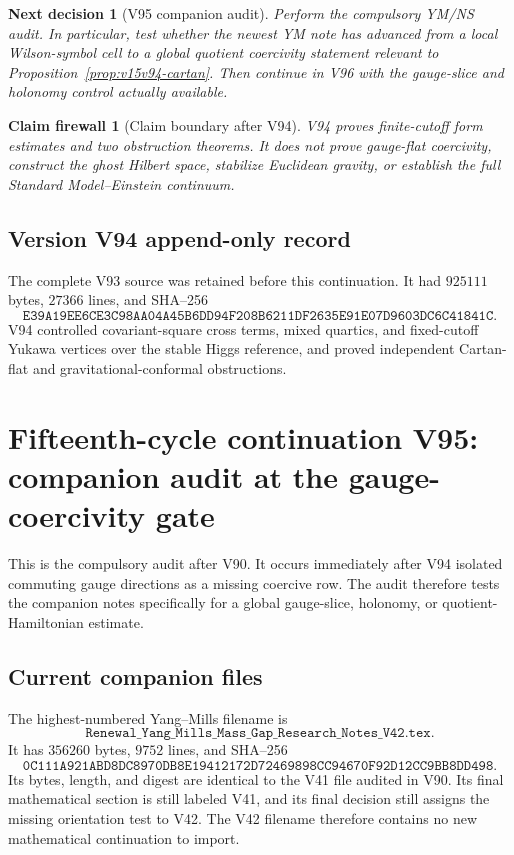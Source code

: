 \documentclass[11pt]{article}
\newtheorem{firewall}[theorem]{Claim firewall}
\newtheorem{decision}[theorem]{Next decision}
\theoremstyle{remark}
\begin{document}
\begin{decision}[V95 companion audit]
\label{dec:v15v94-next}
Perform the compulsory YM/NS audit.  In particular, test whether the
newest YM note has advanced from a local Wilson-symbol cell to a
global quotient coercivity statement relevant to
Proposition~\ref{prop:v15v94-cartan}.  Then continue in V96 with the
gauge-slice and holonomy control actually available.
\end{decision}

\begin{firewall}[Claim boundary after V94]
\label{fire:v15v94}
V94 proves finite-cutoff form estimates and two obstruction
theorems.  It does not prove gauge-flat coercivity, construct the
ghost Hilbert space, stabilize Euclidean gravity, or establish the
full Standard Model--Einstein continuum.
\end{firewall}

\section*{Version V94 append-only record}
The complete V93 source was retained before this continuation.  It
had \(925111\) bytes, \(27366\) lines, and SHA--256
\[
 \texttt{E39A19EE6CE3C98AA04A45B6DD94F208B6211DF2635E91E07D9603DC6C41841C}.
\]
V94 controlled covariant-square cross terms, mixed quartics, and
fixed-cutoff Yukawa vertices over the stable Higgs reference, and
proved independent Cartan-flat and gravitational-conformal
obstructions.
\chapter{Fifteenth-cycle continuation V95: companion audit at the gauge-coercivity gate}
\label{sec:v15v95}

This is the compulsory audit after V90.  It occurs immediately after
V94 isolated commuting gauge directions as a missing coercive row.
The audit therefore tests the companion notes specifically for a
global gauge-slice, holonomy, or quotient-Hamiltonian estimate.

\section{Current companion files}

The highest-numbered Yang--Mills filename is
\[
 \texttt{Renewal\_Yang\_Mills\_Mass\_Gap\_Research\_Notes\_V42.tex}.
                                                               \tag{95.1}
\]
It has \(356260\) bytes, \(9752\) lines, and SHA--256
\[
 \texttt{0C111A921ABD8DC8970DB8E19412172D72469898CC94670F92D12CC9BB8DD498}.
                                                               \tag{95.2}
\]
Its bytes, length, and digest are identical to the V41 file audited
in V90.  Its final mathematical section is still labeled V41, and
its final decision still assigns the missing orientation test to
V42.  The V42 filename therefore contains no new mathematical
continuation to import.
\end{document}
